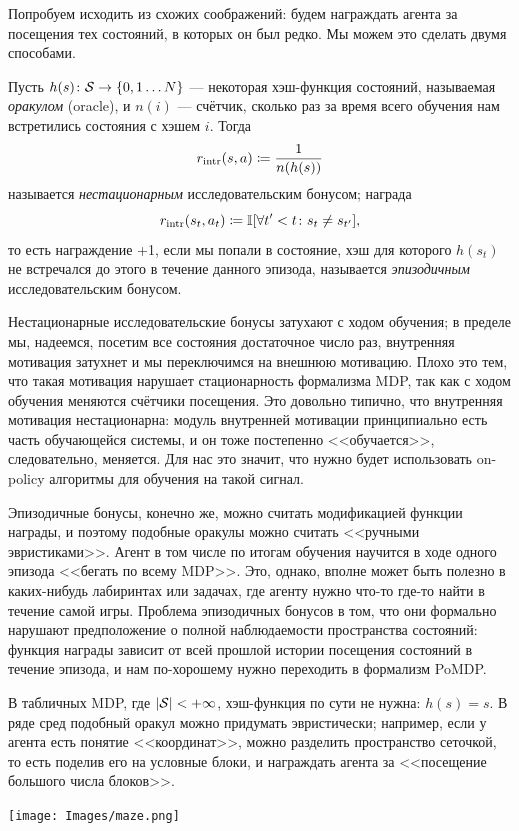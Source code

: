Попробуем исходить из схожих соображений: будем награждать агента за посещения тех состояний, в которых он был редко. Мы можем это сделать двумя способами.

\begin{definition}
Пусть $h(s) \colon \mathcal{S} \to \{0, 1 \dots N\}$ --- некоторая хэш-функция состояний, называемая \emph{оракулом} (oracle), и $n(i)$ --- счётчик, сколько раз за время всего обучения нам встретились состояния с хэшем $i$. Тогда
$$r_{\mathrm{intr}}(s, a) \coloneqq \frac{1}{n(h(s))}$$
называется \emph{нестационарным} исследовательским бонусом; награда
$$r_{\mathrm{intr}}(s_t, a_t) \coloneqq \mathbb{I}[\forall t' < t \colon s_t \neq s_{t'}],$$
то есть награждение +1, если мы попали в состояние, хэш для которого $h(s_t)$ не встречался до этого в течение данного эпизода, называется \emph{эпизодичным} исследовательским бонусом.
\end{definition}

Нестационарные исследовательские бонусы затухают с ходом обучения; в пределе мы, надеемся, посетим все состояния достаточное число раз, внутренняя мотивация затухнет и мы переключимся на внешнюю мотивацию. Плохо это тем, что такая мотивация нарушает стационарность формализма MDP, так как с ходом обучения меняются счётчики посещения. Это довольно типично, что внутренняя мотивация нестационарна: модуль внутренней мотивации принципиально есть часть обучающейся системы, и он тоже постепенно <<обучается>>, следовательно, меняется. Для нас это значит, что нужно будет использовать on-policy алгоритмы для обучения на такой сигнал.

Эпизодичные бонусы, конечно же, можно считать модификацией функции награды, и поэтому подобные оракулы можно считать <<ручными эвристиками>>. Агент в том числе по итогам обучения научится в ходе одного эпизода <<бегать по всему MDP>>. Это, однако, вполне может быть полезно в каких-нибудь лабиринтах или задачах, где агенту нужно что-то где-то найти в течение самой игры. Проблема эпизодичных бонусов в том, что они формально нарушают предположение о полной наблюдаемости пространства состояний: функция награды зависит от всей прошлой истории посещения состояний в течение эпизода, и нам по-хорошему нужно переходить в формализм PoMDP.

\begin{exampleBox}[righthand ratio=0.25, sidebyside, sidebyside align=center, lower separated=false]{}
В табличных MDP, где $|\mathcal{S}| < +\infty$, хэш-функция по сути не нужна: $h(s) = s$. В ряде сред подобный оракул можно придумать эвристически; например, если у агента есть понятие <<координат>>, можно разделить пространство сеточкой, то есть поделив его на условные блоки, и награждать агента за <<посещение большого числа блоков>>. 

\tcblower
\texttt{[image: Images/maze.png]}
\end{exampleBox}

